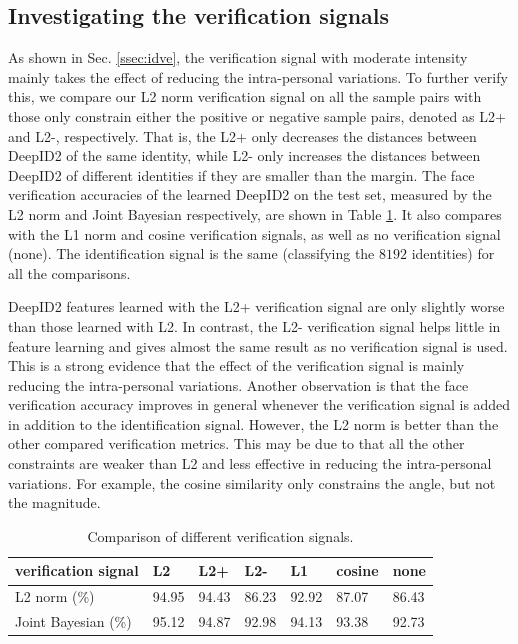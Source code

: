 \documentclass{article} %
\begin{document}
\subsection{Investigating the verification signals}
\label{ssec:verif}

As shown in Sec. \ref{ssec:idve}, the verification signal with moderate intensity mainly takes the effect of reducing the intra-personal variations. To further verify this, we compare our L2 norm verification signal on all the sample pairs with those only constrain either the positive or negative sample pairs, denoted as L2+ and L2-, respectively. That is, the L2+ only decreases the distances between DeepID2 of the same identity, while L2- only increases the distances between DeepID2 of different identities if they are smaller than the margin. The face verification accuracies of the learned DeepID2 on the test set, measured by the L2 norm and Joint Bayesian respectively, are shown in Table \ref{tab:verif}. It also compares with the L1 norm and cosine verification signals, as well as no verification signal (none). The identification signal is the same (classifying the $8192$ identities) for all the comparisons.

DeepID2 features learned with the L2+ verification signal are only slightly worse than those learned with L2. In contrast, the L2- verification signal helps little in feature learning and gives almost the same result as no verification signal is used. This is a strong evidence that the effect of the verification signal is mainly reducing the intra-personal variations. Another observation is that the face verification accuracy improves in general whenever the verification signal is added in addition to the identification signal. However, the L2 norm is better than the other compared verification metrics. This may be due to that all the other constraints are weaker than L2 and less effective in reducing the intra-personal variations. For example, the cosine similarity only constrains the angle, but not the magnitude.

\begin{table}[t]
\caption{Comparison of different verification signals.}
\label{tab:verif}
\vspace{-0.0in}
\begin{center}
\begin{tabular}{p{75pt}|p{23pt}p{23pt}p{23pt}p{23pt}p{23pt}p{23pt}}
\toprule
verification signal & L2 & L2+ & L2- & L1 & cosine & none \\
\midrule
L2 norm (\%) & 94.95 & 94.43 & 86.23 & 92.92 & 87.07 & 86.43 \\
Joint Bayesian (\%) & 95.12 & 94.87 & 92.98 & 94.13 & 93.38 & 92.73 \\
\bottomrule
\end{tabular}
\end{center}
\vspace{-0.1in}
\end{table}
\end{document}
